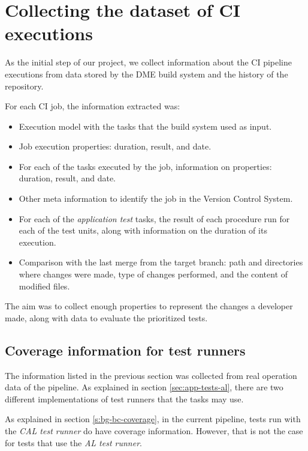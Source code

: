 \section{Collecting the dataset of CI executions}\label{s:method-collecting-dataset}

As the initial step of our project, we collect information about the CI pipeline executions
from data stored by the DME build system and the history of the repository.

For each CI job, the information extracted was:
\begin{itemize}
    \item Execution model with the tasks that the build system used as input.
    \item Job execution properties: duration, result, and date.
    \item For each of the tasks executed by the job, information on properties: duration, result, and date.
    \item Other meta information to identify the job in the Version Control System.
    \item For each of the \emph{application test} tasks, the result of each procedure run for each of the test units, along with information on the duration of its execution.
    \item Comparison with the last merge from the target branch: path and directories where changes were made, type of changes performed, and the content of modified files.
\end{itemize}

The aim was to collect enough properties to represent the changes a developer made, 
along with data to evaluate the prioritized tests.

\subsection{Coverage information for test runners}\label{s:method-collecting-coverage}

The information listed in the previous section was collected from real operation data
of the pipeline. As explained in section \ref{sec:app-tests-al}, there are two different
implementations of test runners that the tasks may use.

As explained in section \ref{s:bg-bc-coverage}, in the current pipeline, tests run with the \emph{CAL test runner}
do have coverage information. However, that is not the case for tests that use the \emph{AL test runner}.

